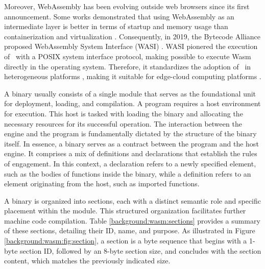 Moreover, WebAssembly has been evolving outside web browsers since its first announcement.
Some works demonstrated that using WebAssembly as an intermediate layer is better in terms of startup and memory usage than containerization and virtualization \cite{pMendkiServerless, 1244493Jacobsson}. 
Consequently, in 2019, the Bytecode Alliance \cite{bytecodealliance} proposed WebAssembly System Interface (WASI) \cite{WASI}. 
WASI pionered the execution of \wasm\ with a POSIX system interface protocol, making possible to execute Wasm directly in the operating system. 
Therefore, it standardizes the adoption of \wasm\ in heterogeneous platforms \cite{bryant2020webassembly}, making it suitable for edge-cloud computing platforms \cite{9640153, wen2020wasmachine}.

\label{background:wasm:binary}

A \Wasm binary usually consists of a single module that serves as the foundational unit for deployment, loading, and compilation. 
A \Wasm program requires a host environment for execution. 
This host is tasked with loading the \Wasm binary and allocating the necessary resources for its successful operation. 
The interaction between the engine and the \Wasm program is fundamentally dictated by the structure of the binary itself.
In essence, a \Wasm binary serves as a contract between the \Wasm program and the host engine. 
It comprises a mix of definitions and declarations that establish the rules of engagement. 
In this context, a declaration refers to a newly specified element, such as the bodies of functions inside the binary, while a definition refers to an element originating from the host, such as imported functions.

A \wasm binary is organized into sections, each with a distinct semantic role and specific placement within the module. 
This structured organization facilitates further machine code compilation. 
Table \ref{background:wasm:sections} provides a summary of these sections, detailing their ID, name, and purpose.
As illustrated in Figure \ref{background:wasm:fig:section}, a \Wasm section is a byte sequence that begins with a 1-byte section ID, followed by an 8-byte section size, and concludes with the section content, which matches the previously indicated size.


